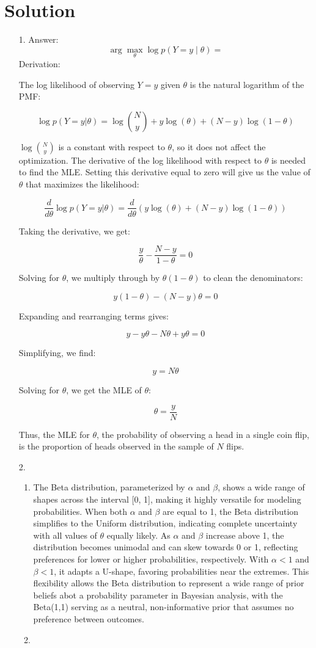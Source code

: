 \documentclass[submit]{harvardml}
\newenvironment{answer}
  {\section*{Solution}}
{}
\begin{document}
\begin{answer}
  \begin{enumerate}
    \item[1.]
      Answer:
      \[
        \arg \max_{\theta} \log p(Y = y \mid \theta) = 
      \]
      Derivation:

The log likelihood of observing \(Y = y\) given \(\theta\) is the natural logarithm of the PMF:

$$
\log p(Y=y|\theta) = \log \binom{N}{y} + y\log(\theta) + (N-y)\log(1-\theta)
$$

\(\log \binom{N}{y}\) is a constant with respect to \(\theta\), so it does not affect the optimization. The derivative of the log likelihood with respect to \(\theta\) is needed to find the MLE. Setting this derivative equal to zero will give us the value of \(\theta\) that maximizes the likelihood:

$$
\frac{d}{d\theta} \log p(Y=y|\theta) = \frac{d}{d\theta} \left( y\log(\theta) + (N-y)\log(1-\theta) \right)
$$

Taking the derivative, we get:

$$
\frac{y}{\theta} - \frac{N-y}{1-\theta} = 0
$$

Solving for \(\theta\), we multiply through by \(\theta(1-\theta)\) to clean the denominators:

$$
y(1-\theta) - (N-y)\theta = 0
$$

Expanding and rearranging terms gives:

$$
y - y\theta - N\theta + y\theta = 0
$$

Simplifying, we find:

$$
y = N\theta
$$

Solving for \(\theta\), we get the MLE of \(\theta\):

$$
\theta = \frac{y}{N}
$$

Thus, the MLE for \(\theta\), the probability of observing a head in a single coin flip, is the proportion of heads observed in the sample of \(N\) flips.

    \item[2.]
      \begin{enumerate}
        \item
The Beta distribution, parameterized by \(\alpha\) and \(\beta\), shows a wide range of shapes across the interval [0, 1], making it highly versatile for modeling probabilities. When both \(\alpha\) and \(\beta\) are equal to 1, the Beta distribution simplifies to the Uniform distribution, indicating complete uncertainty with all values of \(\theta\) equally likely. As \(\alpha\) and \(\beta\) increase above 1, the distribution becomes unimodal and can skew towards 0 or 1, reflecting preferences for lower or higher probabilities, respectively. With \(\alpha < 1\) and \(\beta < 1\), it adapts a U-shape, favoring probabilities near the extremes. This flexibility allows the Beta distribution to represent a wide range of prior beliefs abot a probability parameter in Bayesian analysis, with the Beta(1,1) serving as a neutral, non-informative prior that assumes no preference between outcomes.
        \item


\end{enumerate}
\end{enumerate}
\end{answer}
\end{document}

